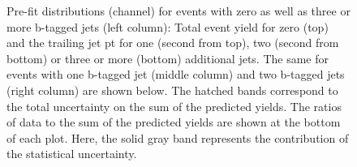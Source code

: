 \begin{figure}[htbp!]
\begin{center}
\caption{Pre-fit distributions (\emu channel) for events with zero as well as three or
  more b-tagged jets (left column): Total event yield for zero (top) and the trailing jet pt for one (second from top),
  two (second from bottom) or three or more (bottom) additional jets. The same for events with one
  b-tagged jet (middle column) and two b-tagged jets (right column) are
  shown below.   
  The hatched bands correspond to the total uncertainty on the sum of
  the predicted yields. The ratios of data to the sum of the
  predicted yields are shown at the bottom of each plot. Here, the solid
  gray band represents the contribution of the statistical uncertainty.  
       \label{fig:xsec_emu_inputdistr}}
  \end{center}
\end{figure}

\begin{figure}[htbp!]
  \begin{center}
     \\


\end{center}
\end{figure}
